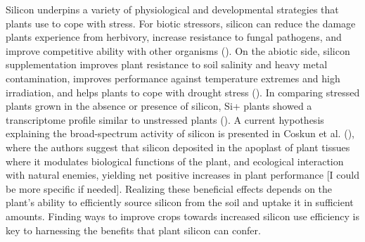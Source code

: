 \documentclass[12pt, letterpaper, ]{report}
\begin{document}
Silicon underpins a variety of physiological and developmental strategies that plants use to cope with stress. For biotic stressors, silicon can reduce the damage plants experience from herbivory, increase resistance to fungal pathogens, and improve competitive ability with other organisms (\cite{fauteux_silicon_2005, katz_silicon_2019}). On the abiotic side, silicon supplementation improves plant resistance to soil salinity and heavy metal contamination, improves performance against temperature extremes and high irradiation, and helps plants to cope with drought stress (\cite{cooke_consistent_2016}). In comparing stressed plants grown in the absence or presence of silicon, Si+ plants showed a transcriptome profile similar to unstressed plants (\cite{coskun_controversies_2019}). A current hypothesis explaining the broad-spectrum activity of silicon is presented in Coskun et al. (\citeyear{coskun_controversies_2019}), where the authors suggest that silicon deposited in the apoplast of plant tissues where it modulates biological functions of the plant, and ecological interaction with natural enemies, yielding net positive increases in plant performance [I could be more specific if needed]. Realizing these beneficial effects depends on the plant’s ability to efficiently source silicon from the soil and uptake it in sufficient amounts. Finding ways to improve crops towards increased silicon use efficiency is key to harnessing the benefits that plant silicon can confer. 
\end{document}
